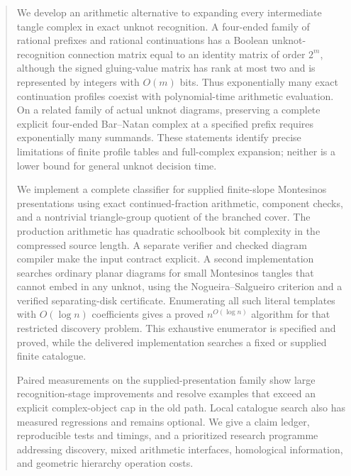 \documentclass[11pt,a4paper]{article}
\theoremstyle{definition}
\theoremstyle{remark}
\numberwithin{equation}{section}
\begin{document}
\begin{abstract}
We develop an arithmetic alternative to expanding every intermediate
tangle complex in exact unknot recognition. A four-ended family of rational
prefixes and rational continuations has a Boolean unknot-recognition
connection matrix equal to an identity matrix of order \(2^m\), although
the signed gluing-value matrix has rank at most two and is represented by
integers with \(O(m)\) bits. Thus exponentially many exact continuation
profiles coexist with polynomial-time arithmetic evaluation. On a related
family of actual unknot diagrams, preserving a complete explicit
four-ended Bar--Natan complex at a specified prefix requires exponentially
many summands. These statements identify precise limitations of finite
profile tables and full-complex expansion; neither is a lower bound for
general unknot decision time.

We implement a complete classifier for supplied finite-slope Montesinos
presentations using exact continued-fraction arithmetic, component checks,
and a nontrivial triangle-group quotient of the branched cover. The production
arithmetic has quadratic schoolbook bit complexity in the compressed source
length. A separate verifier and checked diagram compiler make the input
contract explicit. A second implementation searches ordinary planar diagrams
for small Montesinos tangles that cannot embed in any unknot, using the
Nogueira--Salgueiro criterion and a verified separating-disk certificate.
Enumerating all such literal templates with \(O(\log n)\) coefficients
gives a proved \(n^{O(\log n)}\) algorithm for that restricted discovery
problem. This exhaustive enumerator is specified and proved, while the
delivered implementation searches a fixed or supplied finite catalogue.

Paired measurements on the supplied-presentation family show large
recognition-stage improvements and resolve examples that exceed an explicit
complex-object cap in the old path. Local catalogue search also has measured
regressions and remains optional. We give a claim ledger, reproducible tests
and timings, and a prioritized research programme addressing discovery,
mixed arithmetic interfaces, homological information, and geometric
hierarchy operation costs.
\end{abstract}
\tableofcontents
\clearpage
\end{document}
